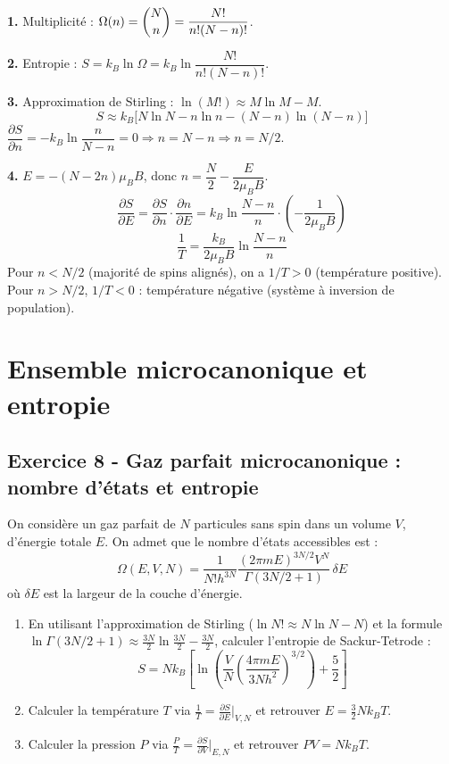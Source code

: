 \documentclass[12pt,a4paper]{article}
\begin{document}
\begin{boitecorrige}
\textbf{1.} Multiplicité : $\Omega(n) = \dbinom{N}{n} = \dfrac{N!}{n!(N-n)!}$.

\textbf{2.} Entropie : $S = k_B\ln\Omega = k_B\ln\dfrac{N!}{n!(N-n)!}$.

\textbf{3.} Approximation de Stirling : $\ln(M!) \approx M\ln M - M$.
\[
S \approx k_B\bigl[N\ln N - n\ln n - (N-n)\ln(N-n)\bigr]
\]
$\dfrac{\partial S}{\partial n} = -k_B\ln\dfrac{n}{N-n} = 0 \Rightarrow n = N-n \Rightarrow n = N/2$.

\textbf{4.} $E = -(N-2n)\mu_BB$, donc $n = \dfrac{N}{2} - \dfrac{E}{2\mu_BB}$.
\[
\frac{\partial S}{\partial E} = \frac{\partial S}{\partial n}\cdot\frac{\partial n}{\partial E} = k_B\ln\frac{N-n}{n}\cdot\left(-\frac{1}{2\mu_BB}\right)
\]
\[
\frac{1}{T} = \frac{k_B}{2\mu_BB}\ln\frac{N-n}{n}
\]
Pour $n < N/2$ (majorité de spins alignés), on a $1/T > 0$ (température positive). Pour $n > N/2$, $1/T < 0$ : température négative (système à inversion de population).
\end{boitecorrige}


\newpage
\section{Ensemble microcanonique et entropie}

\subsection*{Exercice 8 - Gaz parfait microcanonique : nombre d'états et entropie \niveau{\moyen}}

\begin{boiteexercice}
On considère un gaz parfait de $N$ particules sans spin dans un volume $V$, d'énergie totale $E$. On admet que le nombre d'états accessibles est :
\[
\Omega(E,V,N) = \frac{1}{N!h^{3N}}\frac{(2\pi mE)^{3N/2}V^N}{\Gamma(3N/2+1)}\,\delta E
\]
où $\delta E$ est la largeur de la couche d'énergie.
\begin{enumerate}
  \item En utilisant l'approximation de Stirling ($\ln N!\approx N\ln N - N$) et la formule $\ln\Gamma(3N/2+1)\approx\frac{3N}{2}\ln\frac{3N}{2}-\frac{3N}{2}$, calculer l'entropie de Sackur-Tetrode :
  \[
  S = Nk_B\left[\ln\!\left(\frac{V}{N}\left(\frac{4\pi mE}{3Nh^2}\right)^{3/2}\right) + \frac{5}{2}\right]
  \]
  \item Calculer la température $T$ via $\frac{1}{T} = \frac{\partial S}{\partial E}\Big|_{V,N}$ et retrouver $E = \frac{3}{2}Nk_BT$.
  \item Calculer la pression $P$ via $\frac{P}{T} = \frac{\partial S}{\partial V}\Big|_{E,N}$ et retrouver $PV = Nk_BT$.
\end{enumerate}
\end{boiteexercice}
\end{document}
